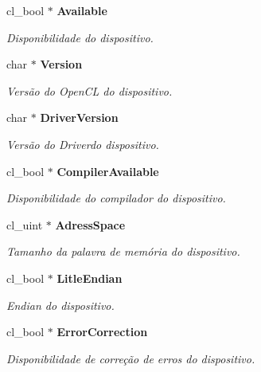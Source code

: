 \begin{DoxyCompactItemize}
\mbox{\label{structdevices_a69f3ac687998d8e0325d11b5ffdb83b3}} 
cl\+\_\+bool $\ast$ \textbf{ Available}
\begin{DoxyCompactList}\small\item\em Disponibilidade do dispositivo. \end{DoxyCompactList}\item 
\mbox{\label{structdevices_abc057f42fdaf5e63835a8272aefe278e}} 
char $\ast$ \textbf{ Version}
\begin{DoxyCompactList}\small\item\em Versão do Open\+CL do dispositivo. \end{DoxyCompactList}\item 
\mbox{\label{structdevices_a80db1b5836fa2f329777658847144c3a}} 
char $\ast$ \textbf{ Driver\+Version}
\begin{DoxyCompactList}\small\item\em Versão do Driverdo dispositivo. \end{DoxyCompactList}\item 
\mbox{\label{structdevices_accb48def3c87e3dcde3061ea53ca156f}} 
cl\+\_\+bool $\ast$ \textbf{ Compiler\+Available}
\begin{DoxyCompactList}\small\item\em Disponibilidade do compilador do dispositivo. \end{DoxyCompactList}\item 
\mbox{\label{structdevices_a182e89c37d67b506545b1c9e997d6ea0}} 
cl\+\_\+uint $\ast$ \textbf{ Adress\+Space}
\begin{DoxyCompactList}\small\item\em Tamanho da palavra de memória do dispositivo. \end{DoxyCompactList}\item 
\mbox{\label{structdevices_a8390af633e64c708dc94de7adaa772a4}} 
cl\+\_\+bool $\ast$ \textbf{ Litle\+Endian}
\begin{DoxyCompactList}\small\item\em Endian do dispositivo. \end{DoxyCompactList}\item 
\mbox{\label{structdevices_a5478070b6e9b3d75d1e556299e01e7a9}} 
cl\+\_\+bool $\ast$ \textbf{ Error\+Correction}
\begin{DoxyCompactList}\small\item\em Disponibilidade de correção de erros do dispositivo. \end{DoxyCompactList}\item 
\mbox{\label{structdevices_a8fa9f23457281b6462ab0c295bb7c1ad}} 

\end{DoxyCompactItemize}
